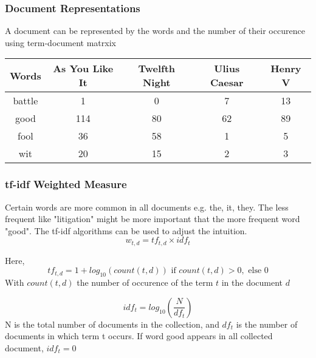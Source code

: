 \documentclass[notheorems, aspectratio=54]{beamer}
\begin{document}
\begin{frame}
\frametitle{Document Representations}
A document can be represented by the words and the number of their occurence using term-document matrxix
\begin{center}
 \begin{tabular}{c c c c c} 
 \hline
 Words & As You Like It& Twelfth Night& Ulius Caesar& Henry V\\ [0.5ex] 
 \hline\hline
 battle & 1 & 0 & 7 &13 \\ 
 \hline
 good & 114 & 80 &62 & 89\\
 \hline
 fool & 36 & 58 & 1 & 5 \\
 \hline
 wit & 20 & 15 & 2 & 3 \\
 \hline
\end{tabular}
\end{center}

\end{frame}


\begin{frame}
\frametitle{tf-idf Weighted Measure}
Certain words are more common in all documents e.g. the, it, they. The less frequent like "litigation" might be more important that the more frequent word "good". The tf-idf algorithms can be used to adjust the intuition.
$$
w_{t,d} = tf_{t,d}\times idf_{t}
$$

Here,
$$
tf_{t, d}=1 + log_{10}(count(t, d)) \text{ if } count(t, d) > 0, \text{ else } 0
$$
With $count(t, d)$  the number of occurence of the term $t$ in the document $d$

$$
idf_{t}=log_{10}\left(\frac{N}{df_t}\right)
$$ 
N is the total number of documents in the collection, and $df_t$ is the number of documents in which term t occurs. If word good appears in all collected document, $idf_t=0$

\end{frame}
\end{document}
